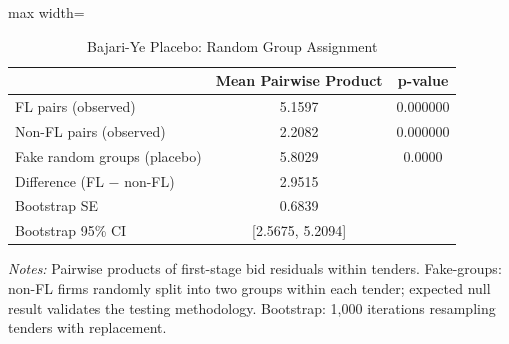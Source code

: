 \begin{table}[htbp]
\centering
\caption{Bajari-Ye Placebo: Random Group Assignment}
\label{tab:bajari_ye_placebo}
\begin{adjustbox}{max width=\textwidth}
\begin{threeparttable}
\small
\begin{tabular}{lcc}
\toprule
 & Mean Pairwise Product & p-value \\
\midrule
FL pairs (observed) & 5.1597 & 0.000000 \\
Non-FL pairs (observed) & 2.2082 & 0.000000 \\
Fake random groups (placebo) & 5.8029 & 0.0000 \\
\midrule
Difference (FL $-$ non-FL) & 2.9515 & \\
Bootstrap SE & 0.6839 & \\
Bootstrap 95\% CI & [2.5675, 5.2094] & \\
\bottomrule
\end{tabular}
\begin{tablenotes}
\small
\item \textit{Notes:} Pairwise products of first-stage bid residuals within tenders.
Fake-groups: non-FL firms randomly split into two groups within each tender;
expected null result validates the testing methodology.
Bootstrap: 1,000 iterations resampling tenders with replacement.
\end{tablenotes}
\end{threeparttable}
\end{adjustbox}
\end{table}
